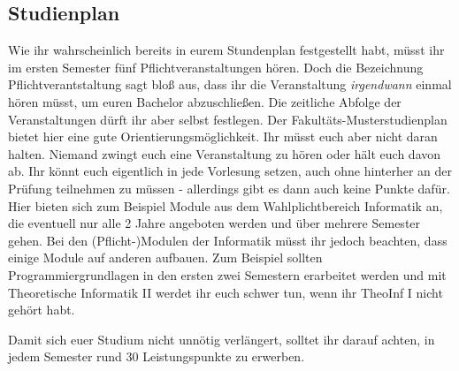 \subsection{Studienplan}
	\label{bach_studienplan}
	Wie ihr wahrscheinlich bereits in eurem Stundenplan festgestellt habt, müsst ihr im ersten Semester fünf Pflichtveranstaltungen hören. Doch die Bezeichnung Pflichtverantstaltung sagt bloß aus, dass ihr die Veranstaltung \emph{irgendwann} einmal hören müsst, um euren Bachelor abzuschließen. Die zeitliche Abfolge der Veranstaltungen dürft ihr aber selbst festlegen. Der Fakultäts-Musterstudienplan  bietet hier eine gute Orientierungsmöglichkeit. Ihr müsst euch aber nicht daran halten. Niemand zwingt euch eine Veranstaltung zu hören oder hält euch davon ab. Ihr könnt euch eigentlich in jede Vorlesung setzen, auch ohne hinterher an der Prüfung teilnehmen zu müssen - allerdings gibt es dann auch keine Punkte dafür. Hier bieten sich zum Beispiel Module aus dem Wahlplichtbereich Informatik an, die eventuell nur alle 2 Jahre angeboten werden und über mehrere Semester gehen. Bei den (Pflicht-)Modulen der Informatik müsst ihr jedoch beachten, dass einige Module auf anderen aufbauen. Zum Beispiel sollten Programmiergrundlagen in den ersten zwei Semestern erarbeitet werden und mit Theoretische Informatik II werdet ihr euch schwer tun, wenn ihr TheoInf I nicht gehört habt.

	Damit sich euer Studium nicht unnötig verlängert, solltet ihr darauf achten, in jedem Semester rund 30 Leistungspunkte zu erwerben. 
